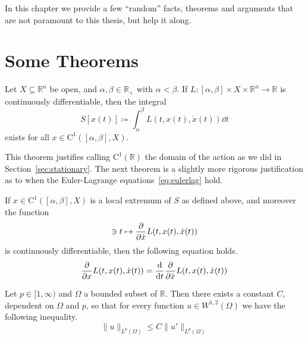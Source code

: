 
In this chapter we provide a few ``random'' facts, theorems and arguments that
are not paramount to this thesis, but help it along.

\section{Some Theorems}\label{sec:apptheorems}
\begin{theorem}\label{th:actionexist}
    Let \(X\subseteq\mathbb{R}^n\) be open, and \(\alpha, \beta \in\mathbb{R}_+\)
    with \(\alpha < \beta\). If \(L:[\alpha,\beta]\times X\times \mathbb{R}^n\to\mathbb{R}\)
    is continuously differentiable, then the integral
    \begin{equation}
        S[x(t)]\coloneqq\int_\alpha^\beta L(t, x(t), \dot{x}(t))\dd{t}
    \end{equation}
    exists for all \(x\in\mathrm{C}^1([\alpha,\beta],X)\).
\end{theorem}
This theorem justifies calling \(\mathrm{C}^1(\mathbb{R})\) the domain of the
action as we did in Section~\ref{sec:stationary}. The next theorem is a slightly
more rigorous justification as to when the Euler-Lagrange
equations~\ref{eq:eulerlag} hold.
\begin{theorem}
    If \(x\in\mathrm{C}^1([\alpha,\beta],X)\) is a local extremum of \(S\) as
    defined above, and moreover the function
    \begin{equation}
        [\alpha,\beta]\ni t\mapsto \pdv{\dot{x}}L(t, x(t),\dot{x}(t))
    \end{equation}
    is continuously differentiable, then the following equation holds.
    \begin{equation}
        \pdv{x}L(t, x(t),\dot{x}(t)) = \dv{t}\pdv{\dot{x}}L(t, x(t),\dot{x}(t))
    \end{equation}
\end{theorem}

\begin{theorem}
    Let \(p\in[1,\infty)\) and \(\Omega\) a bounded subset of \(\mathbb{R}\). %
    Then there exists a constant \(C\), dependent on \(\Omega\) and \(p\), so
    that for every function \(u\in W^{1,2}(\Omega)\) we have the following
    inequality.
    \begin{equation}
        \|u\|_{L^p(\Omega)} \leq C\|u'\|_{L^p(\Omega)}
    \end{equation}
\end{theorem}



